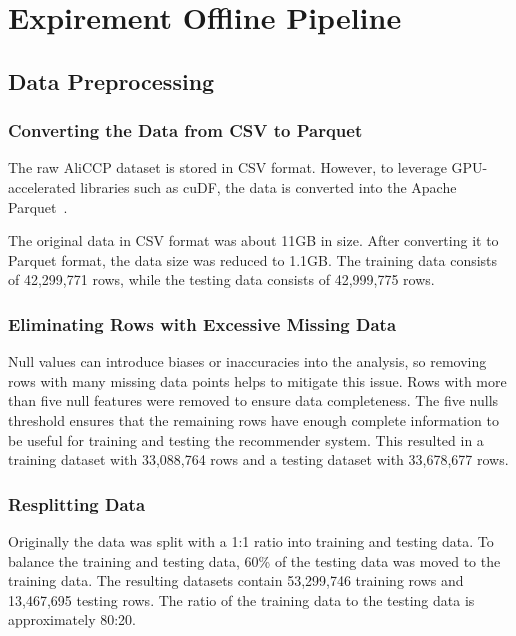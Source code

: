 \section{Expirement Offline Pipeline}

\subsection{Data Preprocessing}

\subsubsection{Converting the Data from CSV to Parquet}

The raw AliCCP dataset is stored in CSV format. However, to leverage GPU-accelerated libraries such as cuDF, the data is converted into the Apache Parquet~\cite{ApacheParquet}.


The original data in CSV format was about 11GB in size. After converting it to Parquet format, the data size was reduced to 1.1GB.
The training data consists of 42,299,771 rows, while the testing data consists of 42,999,775 rows.

\subsubsection{Eliminating Rows with Excessive Missing Data}

Null values can introduce biases or inaccuracies into the analysis, so removing rows with many missing data points helps to mitigate this issue.
Rows with more than five null features were removed to ensure data completeness.
The five nulls threshold ensures that the remaining rows have enough complete information to be useful for training and testing the recommender system.
This resulted in a training dataset with 33,088,764 rows and a testing dataset with 33,678,677 rows.

\subsubsection{Resplitting Data}

Originally the data was split with a 1:1 ratio into training and testing data.
To balance the training and testing data, 60\% of the testing data was moved to the training data. 
The resulting datasets contain 53,299,746 training rows and 13,467,695 testing rows.
The ratio of the training data to the testing data is approximately 80:20.


